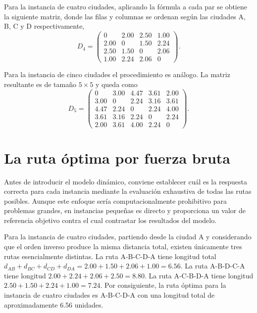 \documentclass[12pt,a4paper]{article}
\begin{document}
Para la instancia de cuatro ciudades, aplicando la fórmula a cada par se obtiene la siguiente matriz, donde las filas y columnas se ordenan según las ciudades A, B, C y D respectivamente,
\begin{equation}
    D_4 = \begin{pmatrix}
        0 & 2.00 & 2.50 & 1.00 \\
        2.00 & 0 & 1.50 & 2.24 \\
        2.50 & 1.50 & 0 & 2.06 \\
        1.00 & 2.24 & 2.06 & 0
    \end{pmatrix}.
\end{equation}

Para la instancia de cinco ciudades el procedimiento es análogo. La matriz resultante es de tamaño $5 \times 5$ y queda como
\begin{equation}
    D_5 = \begin{pmatrix}
        0 & 3.00 & 4.47 & 3.61 & 2.00 \\
        3.00 & 0 & 2.24 & 3.16 & 3.61 \\
        4.47 & 2.24 & 0 & 2.24 & 4.00 \\
        3.61 & 3.16 & 2.24 & 0 & 2.24 \\
        2.00 & 3.61 & 4.00 & 2.24 & 0
    \end{pmatrix}.
\end{equation}

\section{La ruta óptima por fuerza bruta}

Antes de introducir el modelo dinámico, conviene establecer cuál es la respuesta correcta para cada instancia mediante la evaluación exhaustiva de todas las rutas posibles. Aunque este enfoque sería computacionalmente prohibitivo para problemas grandes, en instancias pequeñas es directo y proporciona un valor de referencia objetivo contra el cual contrastar los resultados del modelo.

Para la instancia de cuatro ciudades, partiendo desde la ciudad A y considerando que el orden inverso produce la misma distancia total, existen únicamente tres rutas esencialmente distintas. La ruta A-B-C-D-A tiene longitud total $d_{AB} + d_{BC} + d_{CD} + d_{DA} = 2.00 + 1.50 + 2.06 + 1.00 = 6.56$. La ruta A-B-D-C-A tiene longitud $2.00 + 2.24 + 2.06 + 2.50 = 8.80$. La ruta A-C-B-D-A tiene longitud $2.50 + 1.50 + 2.24 + 1.00 = 7.24$. Por consiguiente, la ruta óptima para la instancia de cuatro ciudades es A-B-C-D-A con una longitud total de aproximadamente 6.56 unidades.
\end{document}
